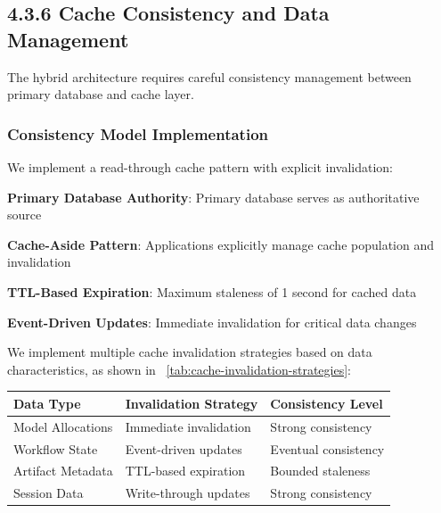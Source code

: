 \subsection*{4.3.6 Cache Consistency and Data Management}

The hybrid architecture requires careful consistency management between primary database and cache layer.

\subsubsection*{Consistency Model Implementation}

We implement a read-through cache pattern with explicit invalidation:

\begin{expandedlist}
    \item \textbf{Primary Database Authority}: Primary database serves as authoritative source
    \item \textbf{Cache-Aside Pattern}: Applications explicitly manage cache population and invalidation
    \item \textbf{TTL-Based Expiration}: Maximum staleness of 1 second for cached data
    \item \textbf{Event-Driven Updates}: Immediate invalidation for critical data changes
\end{expandedlist}

We implement multiple cache invalidation strategies based on data characteristics, as shown in ~\ref{tab:cache-invalidation-strategies}:

\begin{center}
\begin{tabular}{@{}lll@{}}
\toprule
\textbf{Data Type} & \textbf{Invalidation Strategy} & \textbf{Consistency Level} \\
\midrule
Model Allocations & Immediate invalidation & Strong consistency \\
Workflow State & Event-driven updates & Eventual consistency \\
Artifact Metadata & TTL-based expiration & Bounded staleness \\
Session Data & Write-through updates & Strong consistency \\
\bottomrule
\end{tabular}
\label{tab:cache-invalidation-strategies}
\end{center}

